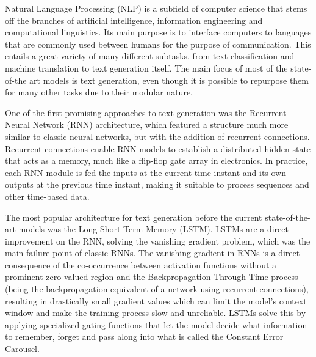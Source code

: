 Natural Language Processing (NLP) is a subfield of computer science that stems off the branches of artificial intelligence, information engineering and computational linguistics.
Its main purpose is to interface computers to languages that are commonly used between humans for the purpose of communication.
This entails a great variety of many different subtasks, from text classification and machine translation to text generation itself.
The main focus of most of the state-of-the art models is text generation, even though it is possible to repurpose them for many other tasks due to their modular nature.

One of the first promising approaches to text generation was the Recurrent Neural Network (RNN) architecture, which featured a structure much more similar to classic neural networks, but with the addition of recurrent connections.
Recurrent connections enable RNN models to establish a distributed hidden state that acts as a memory, much like a flip-flop gate array in electronics.
In practice, each RNN module is fed the inputs at the current time instant and its own outputs at the previous time instant, making it suitable to process sequences and other time-based data.

\begin{figure}[H]
    \centering
    \quad
    \caption{}
    \label{fig:background_rnn_lstm}
\end{figure}

The most popular architecture for text generation before the current state-of-the-art models was the Long Short-Term Memory (LSTM).
LSTMs are a direct improvement on the RNN, solving the vanishing gradient problem, which was the main failure point of classic RNNs.
The  vanishing gradient in RNNs is a direct consequence of the co-occurrence between activation functions without a prominent zero-valued region and the Backpropagation Through Time process (being the backpropagation equivalent of a network using recurrent connections), resulting in drastically small gradient values which can limit the model's context window and make the training process slow and unreliable.
LSTMs solve this by applying specialized gating functions that let the model decide what information to remember, forget and pass along into what is called the Constant Error Carousel.

